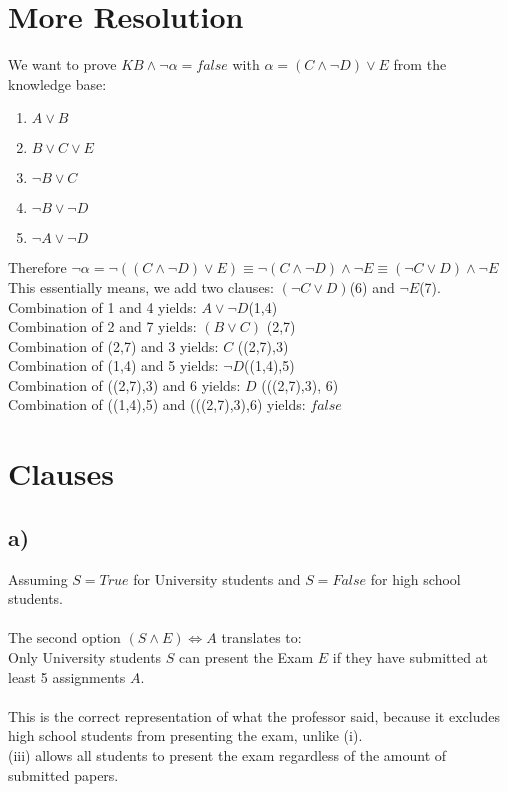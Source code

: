 \documentclass[a4paper]{article}
\begin{document}
\section{More Resolution}
We want to prove $KB \land \neg \alpha = false$ with $\alpha = (C \land \neg D) \lor E$ from the knowledge base:
\begin{enumerate}
	\item $A \lor B$
	\item $B \lor C \lor E$
	\item $\neg B \lor C$
	\item $\neg B \lor \neg D$
	\item $\neg A \lor \neg D$
\end{enumerate}
Therefore $\neg \alpha = \neg((C \land \neg D) \lor E) \equiv \neg(C \land \neg D) \land \neg E \equiv (\neg C \lor D) \land \neg E$\\
This essentially means, we add two clauses: $(\neg C \lor D)$(6) and $\neg E$(7).\\
Combination of 1 and 4 yields: $A \lor \neg D$(1,4) \\
Combination of 2 and 7 yields: $(B \lor C)$ (2,7)\\
Combination of (2,7) and 3 yields: $C$ ((2,7),3)\\
Combination of (1,4) and 5 yields: $\neg D$((1,4),5)\\
Combination of ((2,7),3) and 6 yields: $D$ (((2,7),3), 6)\\
Combination of ((1,4),5) and (((2,7),3),6) yields: $false$ \\

\section{Clauses}
\subsection*{a)}
	Assuming $S = True$ for University students and $S = False$ for high school students. \\\\
	The second option $(S \land E) \Leftrightarrow A$ translates to: \\ 
	Only University students $S$ can present the Exam $E$ if they have submitted at least 5 assignments $A$. \\\\
	This is the correct representation of what the professor said, because it excludes high school students from presenting the exam, unlike (i). \\
	(iii) allows all students to present the exam regardless of the amount of submitted papers.
	
\end{document}
